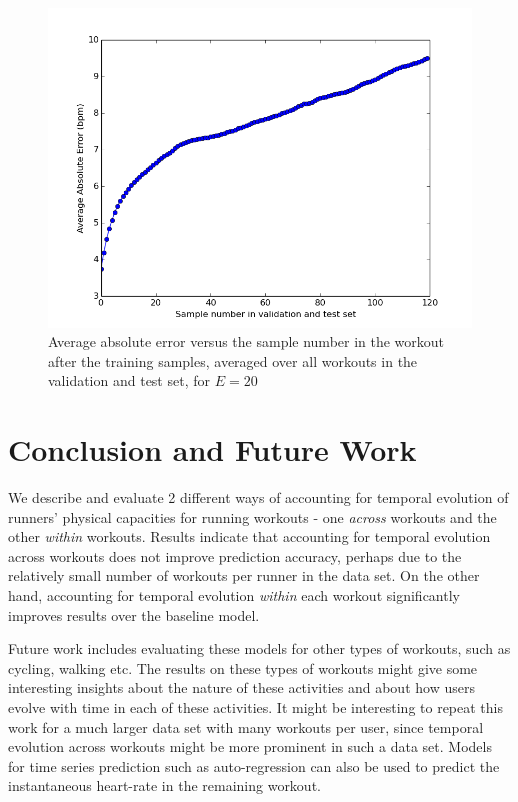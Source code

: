 \documentclass{acm_proc_article-sp}
\begin{document}
\begin{figure}[h]
\centering
\includegraphics[scale=0.4]{../src/plots/many_insthr_error_vs_sample_number}
\caption{\label{figManyInstHrErrorVsSampleNumberValTest} Average absolute error versus the sample number in the workout after the training samples, averaged over all workouts in the validation and test set, for $E = 20$}
\end{figure}

\section{Conclusion and Future Work}
We describe and evaluate 2 different ways of accounting for temporal evolution of runners' physical capacities for running workouts - one \emph{across} workouts and the other \emph{within} workouts. Results indicate that accounting for temporal evolution across workouts does not improve prediction accuracy, perhaps due to the relatively small number of workouts per runner in the data set. On the other hand, accounting for temporal evolution \emph{within} each workout significantly improves results over the baseline model.

Future work includes evaluating these models for other types of workouts, such as cycling, walking etc. The results on these types of workouts might give some interesting insights about the nature of these activities and about how users evolve with time in each of these activities. It might be interesting to repeat this work for a much larger data set with many workouts per user, since temporal evolution across workouts might be more prominent in such a data set. Models for time series prediction such as auto-regression \cite{autoRegressiveModelWiki} can also be used to predict the instantaneous heart-rate in the remaining workout.




\end{document}
